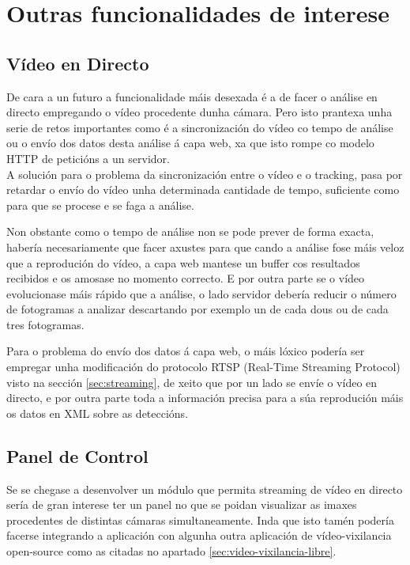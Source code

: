     
    \section{Outras funcionalidades de interese}
    
        \subsection{Vídeo en Directo}
            De cara a un futuro a funcionalidade máis desexada é a de facer o análise en directo 
            empregando o vídeo procedente dunha cámara. Pero isto prantexa unha serie de retos 
            importantes como é a sincronización do vídeo co tempo de análise ou o envío dos datos desta 
            análise á capa web, xa que isto rompe co modelo HTTP de peticións a un servidor.\\
            
            A solución para o problema da sincronización entre o vídeo e o tracking, pasa por retardar o
            envío do vídeo unha determinada cantidade de tempo, suficiente como para que se procese e se
            faga a análise.
            
            Non obstante como o tempo de análise non se pode prever de forma exacta, habería
            necesariamente que facer axustes para que cando a análise fose máis veloz que a reprodución
            do vídeo, a capa web mantese un buffer cos resultados recibidos e os amosase no momento 
            correcto. E por outra parte se o vídeo evolucionase máis rápido que a análise, o lado 
            servidor debería reducir o número de fotogramas a analizar descartando por exemplo un de
            cada dous ou de cada tres fotogramas.
            
            Para o problema do envío dos datos á capa web, o máis lóxico podería ser empregar unha 
            modificación do protocolo RTSP (Real-Time Streaming Protocol) visto na sección 
            \ref{sec:streaming}, de xeito que por un lado se envíe o vídeo en directo, e por outra parte
            toda a información precisa para a súa reprodución máis os datos en XML sobre as deteccións.
        
        \subsection{Panel de Control}
            Se se chegase a desenvolver un módulo que permita streaming de vídeo en directo sería de
            gran interese ter un panel no que se poidan visualizar as imaxes procedentes de 
            distintas cámaras simultaneamente. Inda que isto tamén podería facerse integrando a 
            aplicación con algunha outra aplicación de vídeo-vixilancia open-source como as citadas 
            no apartado \ref{sec:video-vixilancia-libre}.
  
  
  
  
  
  
  
  
  
  
